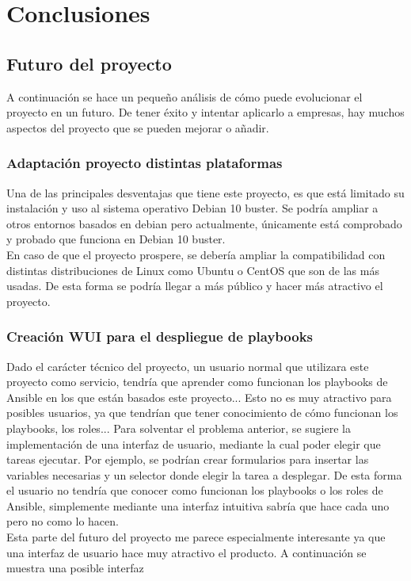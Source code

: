 \chapter {Conclusiones}


\section{Futuro del proyecto}
\begin{text}
	A continuación se hace un pequeño análisis de cómo puede evolucionar el proyecto en un futuro. De tener éxito y intentar aplicarlo a empresas, hay muchos aspectos del proyecto que se pueden mejorar o añadir. 
\end{text}
\subsection{Adaptación proyecto distintas plataformas}
\begin{text}
	Una de las principales desventajas que tiene este proyecto, es que está limitado su instalación y uso al sistema operativo Debian 10 buster. Se podría ampliar a otros entornos basados en debian pero actualmente, únicamente está comprobado y probado que funciona en Debian 10 buster. \\
	En caso de que el proyecto prospere, se debería ampliar la compatibilidad con distintas distribuciones de Linux como Ubuntu o CentOS que son de las más usadas. De esta forma se podría llegar a más público y hacer más atractivo el proyecto.
\end{text}
\subsection{Creación WUI para el despliegue de playbooks}
\begin{text}
	Dado el carácter técnico del proyecto, un usuario normal que utilizara este proyecto como servicio, tendría que aprender como funcionan los playbooks de Ansible en los que están basados este proyecto... Esto no es muy atractivo para posibles usuarios, ya que tendrían que tener conocimiento de cómo funcionan los playbooks, los roles... Para solventar el problema anterior, se sugiere la implementación de una interfaz de usuario, mediante la cual poder elegir que tareas ejecutar. Por ejemplo, se podrían crear formularios para insertar las variables necesarias y un selector donde elegir la tarea a desplegar. De esta forma el usuario no tendría que conocer como funcionan los playbooks o los roles de Ansible, simplemente mediante una interfaz intuitiva sabría que hace cada uno pero no como lo hacen. \\
	Esta parte del futuro del proyecto me parece especialmente interesante ya que una interfaz de usuario hace muy atractivo el producto. A continuación se muestra una posible interfaz
\end{text}
